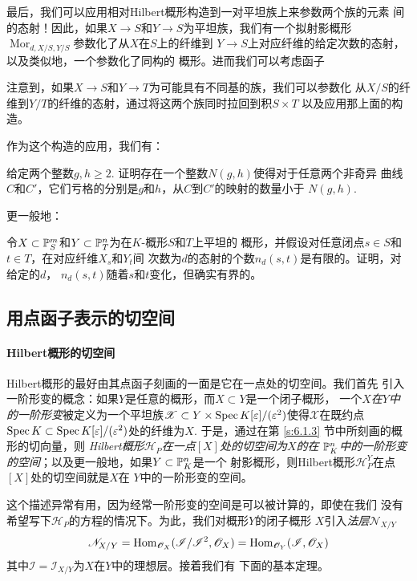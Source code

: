 最后，我们可以应用相对Hilbert概形构造到一对平坦族上来参数两个族的元素
间的态射！因此，如果$X\to S$和$Y\to S$为平坦族，我们有一个拟射影概形
$\operatorname{Mor}_{d,X/S,Y/S}$参数化了从$X$在$S$上的纤维到
$Y\to S$上对应纤维的给定次数的态射，以及类似地，一个参数化了同构的
概形。进而我们可以考虑函子

注意到，如果$X\to S$和$Y\to T$为可能具有不同基的族，我们可以参数化
从$X/S$的纤维到$Y/T$的纤维的态射，通过将这两个族同时拉回到积$S\times T$
以及应用那上面的构造。

作为这个构造的应用，我们有：

\begin{exe}\label{exe:6.27}
给定两个整数$g,h\geq 2$. 证明存在一个整数$N(g,h)$使得对于任意两个非奇异
曲线$C$和$C'$，它们亏格的分别是$g$和$h$，从$C$到$C'$的映射的数量小于
$N(g,h)$.
\end{exe}

更一般地：

\begin{exe}\label{exe:6.28}
    令$X\subset \P_S^m$和$Y\subset \P_T^n$为在$K$-概形$S$和$T$上平坦的
    概形，并假设对任意闭点$s\in S$和$t\in T$，在对应纤维$X_s$和$Y_t$间
    次数为$d$的态射的个数$n_d(s,t)$是有限的。证明，对给定的$d$，
    $n_d(s,t)$随着$s$和$t$变化，但确实有界的。
\end{exe}

\subsection{用点函子表示的切空间}\label{s:6.2.3}

\paragraph*{Hilbert概形的切空间}
Hilbert概形的最好由其点函子刻画的一面是它在一点处的切空间。我们首先
引入一阶形变的概念：如果$Y$是任意的概形，而$X\subset Y$是一个闭子概形，
一个\emph{$X$在$Y$中的一阶形变}被定义为一个平坦族$\mathscr X\subset 
Y\times \spec K[\varepsilon]/(\varepsilon^2)$使得$\mathscr X$在既约点
$\spec K\subset \spec K[\varepsilon]/(\varepsilon^2)$处的纤维为$X$.
于是，通过在第 \ref{s:6.1.3} 节中所刻画的概形的切向量，则
\emph{Hilbert概形$\mathscr H_P$在一点$[X]$处的切空间为$X$的在
$\P_K^n$中的一阶形变的空间}；以及更一般地，如果$Y\subset \P_K^n$是一个
射影概形，则Hilbert概形$\mathscr H_P^Y$在点$[X]$处的切空间就是$X$在
$Y$中的一阶形变的空间。

这个描述异常有用，因为经常一阶形变的空间是可以被计算的，即使在我们
没有希望写下$\mathscr H_P$的方程的情况下。为此，我们对概形$Y$的闭子概形
$X$引入\emph{法层}$\mathscr N_{X/Y}$
\[
    \mathscr N_{X/Y}=\Hom_{\oo_X}(\mathscr I/\mathscr I^2,\oo_X)
    =\Hom_{\oo_Y}(\mathscr I,\oo_X)
\]
其中$\mathscr I=\mathscr I_{X/Y}$为$X$在$Y$中的理想层。接着我们有
下面的基本定理。

